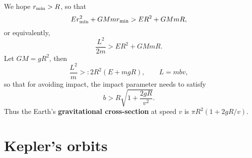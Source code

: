 \documentclass[letter-paper]{tufte-book}
\newenvironment{example}[1][Example]{\begin{trivlist}
\item[\hskip \labelsep {\bfseries #1}]}{\end{trivlist}}
\newcommand\Def[1]{\textbf{#1}}
\begin{document}
\begin{example}[Example: Asteroids]
  We hope $r_{\rm min} > R$, so that
  \begin{equation*}
    Er^2_{\rm min} + GMmr_{\rm min} > ER^2 + GMmR,
  \end{equation*}
  or equivalently,
  \begin{equation*}
    \frac{L^2}{2m} > ER^2 + GMmR.
  \end{equation*}
  Let $GM = gR^2$, then
  \begin{equation*}
    \frac{L^2}{m} >: 2R^2 (E + mgR), \qquad L = mbv,
  \end{equation*}
  so that for avoiding impact, the impact parameter needs to satisfy
  \begin{equation*}
    b > R \sqrt{1 + \frac{2gR}{v^2}}.
  \end{equation*}
  Thus the Earth's \Def{gravitational cross-section} at speed $v$ is $\pi
  R^2 (1+ 2gR / v)$.
\end{example}


\section{Kepler's orbits}
\end{document}
